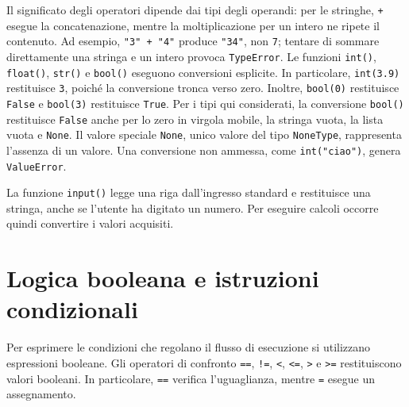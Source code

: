 Il significato degli operatori dipende dai tipi degli operandi: per le
stringhe, \texttt{+} esegue la concatenazione, mentre la moltiplicazione
per un intero ne ripete il contenuto. Ad esempio,
\lstinline|"3" + "4"| produce \lstinline|"34"|, non \texttt{7};
tentare di sommare direttamente una stringa e un intero provoca
\texttt{TypeError}. Le funzioni \texttt{int()}, \texttt{float()},
\texttt{str()} e \texttt{bool()} eseguono conversioni esplicite.
In particolare, \texttt{int(3.9)} restituisce \texttt{3}, poiché
la conversione tronca verso zero. Inoltre, \texttt{bool(0)} restituisce
\texttt{False} e \texttt{bool(3)} restituisce \texttt{True}.
Per i tipi qui considerati, la conversione \texttt{bool()} restituisce
\texttt{False} anche per lo zero in virgola mobile, la stringa vuota,
la lista vuota e \texttt{None}. Il valore speciale \texttt{None}, unico valore
del tipo \texttt{NoneType}, rappresenta l'assenza di un valore.
Una conversione non ammessa, come \lstinline|int("ciao")|,
genera \texttt{ValueError}.

La funzione \texttt{input()} legge una riga dall'ingresso standard e
restituisce una stringa, anche se l'utente ha digitato un numero.
Per eseguire calcoli occorre quindi convertire i valori acquisiti.



\section{Logica booleana e istruzioni condizionali}
\label{sec:fi-python-condizioni}

Per esprimere le condizioni che regolano il flusso di esecuzione si
utilizzano espressioni booleane. Gli operatori di confronto
\texttt{==}, \texttt{!=}, \texttt{<}, \texttt{<=}, \texttt{>} e
\texttt{>=} restituiscono valori booleani.
In particolare, \texttt{==} verifica l'uguaglianza, mentre \texttt{=}
esegue un assegnamento.

